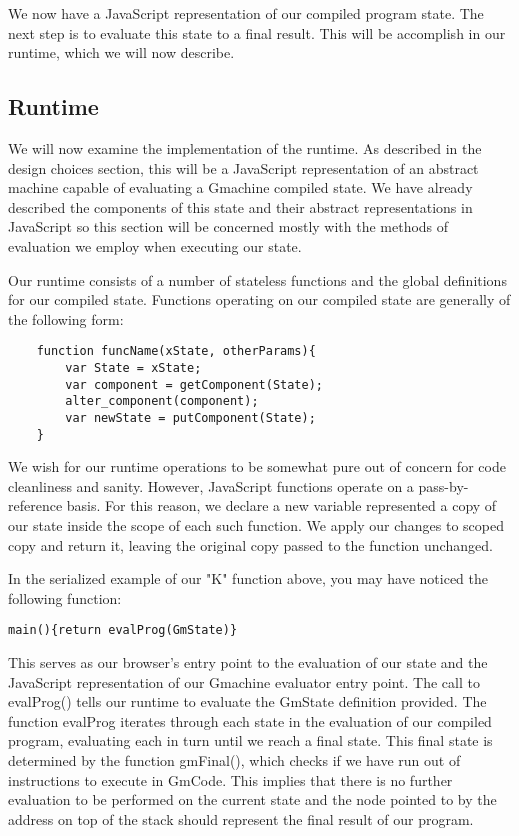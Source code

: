 We now have a JavaScript representation of our compiled program
state. The next step is to evaluate this state to a final 
result. This will be accomplish in our runtime, which we will
now describe.

\subsection{Runtime}
We will now examine the implementation of the runtime. As described
in the design choices section, this will be a JavaScript
representation of an abstract machine capable of evaluating 
a Gmachine compiled state. We have already described the 
components of this state and their abstract representations in
JavaScript so this section will be concerned mostly with the
methods of evaluation we employ when executing our state. 

Our runtime consists of a number of stateless functions and the 
global definitions for our compiled state. Functions operating
on our compiled state are generally of the following form:

\begin{verbatim}
    function funcName(xState, otherParams){
        var State = xState;
        var component = getComponent(State);
        alter_component(component);
        var newState = putComponent(State);
    }
\end{verbatim}

\noindent We wish for our runtime operations to be somewhat
pure out of concern for code cleanliness and sanity. However,
JavaScript functions operate on a pass-by-reference basis. 
For this reason, we declare a new variable represented a 
copy of our state inside the scope of each such function.
We apply our changes to scoped copy and return it, leaving
the original copy passed to the function unchanged.

In the serialized example of our "K" function above, you may
have noticed the following function:

\begin{center}
 \verb!main(){return evalProg(GmState)}!
\end{center}

This serves as our browser's entry point to the evaluation of
our state and the JavaScript representation of our Gmachine
evaluator entry point. The call to evalProg() tells our runtime to evaluate
the GmState definition provided. The function evalProg iterates
through each state in the evaluation of our compiled program,
evaluating each in turn until we reach a final state. This
final state is determined by the function gmFinal(), which 
checks if we have run out of instructions to execute in GmCode.
This implies that there is no further evaluation to be performed
on the current state and the node pointed to by the address on
top of the stack should represent the final result of our 
program. 

